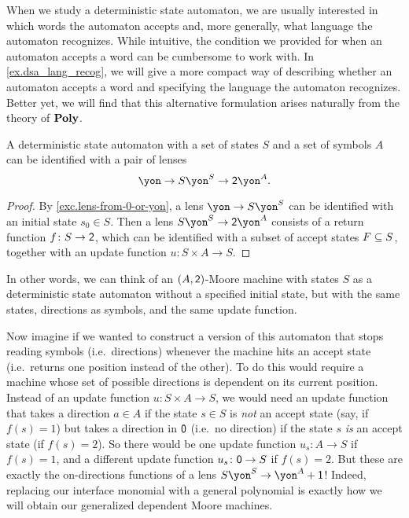 \documentclass[Book-Poly]{subfiles}
\begin{document}
\begin{remark}
When we study a deterministic state automaton, we are usually interested in which words the automaton accepts and, more generally, what language the automaton recognizes.
While intuitive, the condition we provided for when an automaton accepts a word can be cumbersome to work with.
In \cref{ex.dsa_lang_recog}, we will give a more compact way of describing whether an automaton accepts a word and specifying the language the automaton recognizes.
Better yet, we will find that this alternative formulation arises naturally from the theory of $\poly$.
\end{remark}

\begin{proposition} \label{prop.dsa}
A deterministic state automaton with a set of states $S$ and a set of symbols $A$ can be identified with a pair of lenses
\[
  \yon\to S\yon^S\to \2\yon^A.
\]
\end{proposition}
\begin{proof}
By \cref{exc.lens-from-0-or-yon}, a lens $\yon\to S\yon^S$ can be identified with an initial state $s_0\in S$.
Then a lens $S\yon^S\to\2\yon^A$ consists of a return function $f\colon S\to\2$, which can be identified with a subset of accept states $F \ss S$, together with an update function $u \colon S\times A\to S$.
\end{proof}

In other words, we can think of an $(A,\2)$-Moore machine with states $S$ as a deterministic state automaton without a specified initial state, but with the same states, directions as symbols, and the same update function.

Now imagine if we wanted to construct a version of this automaton that stops reading symbols (i.e.\ directions) whenever the machine hits an accept state (i.e.\ returns one position instead of the other).
To do this would require a machine whose set of possible directions is dependent on its current position.
Instead of an update function $u\colon S\times A\to S$, we would need an update function that takes a direction $a\in A$ if the state $s\in S$ is \emph{not} an accept state (say, if $f(s)=1$) but takes a direction in $\0$ (i.e.\ no direction) if the state $s$ \emph{is} an accept state (if $f(s)=2$).
So there would be one update function $u_s\colon A\to S$ if $f(s)=1$, and a different update function $u_s\colon\0\to S$ if $f(s)=2$.
But these are exactly the on-directions functions of a lens $S\yon^S\to\yon^A+\1$!
Indeed, replacing our interface monomial with a general polynomial is exactly how we will obtain our generalized dependent Moore machines.
\end{document}
